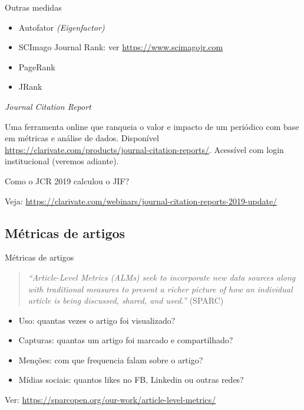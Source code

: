 \begin{frame}{Outras medidas}
\begin{itemize}
\item Autofator \textit{(Eigenfactor)}
\item SCImago Journal Rank: ver \url{https://www.scimagojr.com} 
\item PageRank
\item JRank
\end{itemize}
\end{frame}

\begin{frame}{\textit{Journal Citation Report}}

Uma ferramenta online que ranqueia o valor e impacto de um periódico com base em métricas e análise de dados.  Disponível \url{https://clarivate.com/products/journal-citation-reports/}. Acessível com login institucional (veremos adiante). 

Como o JCR 2019 calculou o JIF? 

Veja: \url{https://clarivate.com/webinars/journal-citation-reports-2019-update/}
\end{frame}

\subsection*{Métricas de artigos}

\begin{frame}{Métricas de artigos}
\begin{quotation}
\textit{``Article-Level Metrics (ALMs) seek to incorporate new data sources along with traditional measures to present a richer picture of how an individual article is being discussed, shared, and used.''} (SPARC)
\end{quotation}
\begin{itemize}
\item Uso: quantas vezes o artigo foi visualizado? 
\item Capturas: quantas um artigo foi marcado e compartilhado?
\item Menções: com que frequencia falam sobre o artigo?
\item Mídias sociais: quantos likes no FB, Linkedin ou outras redes? 
\end{itemize}

Ver: \url{https://sparcopen.org/our-work/article-level-metrics/}
\end{frame}

